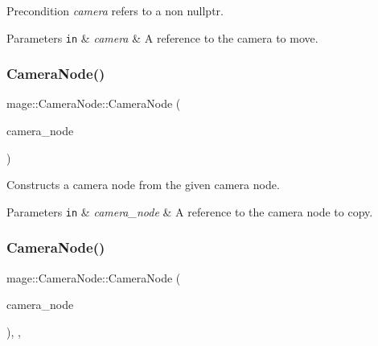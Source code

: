 \begin{DoxyPrecond}{Precondition}
{\itshape camera} refers to a non {\ttfamily nullptr}. 
\end{DoxyPrecond}

\begin{DoxyParams}[1]{Parameters}
\mbox{\tt in}  & {\em camera} & A reference to the camera to move. \\
\hline
\end{DoxyParams}
\hypertarget{classmage_1_1_camera_node_aa0becc29c416c313ebda763edb1b2181}{}\label{classmage_1_1_camera_node_aa0becc29c416c313ebda763edb1b2181} 
\subsubsection{\texorpdfstring{Camera\+Node()}{CameraNode()}\hspace{0.1cm}{\footnotesize\ttfamily [2/3]}}
{\footnotesize\ttfamily mage\+::\+Camera\+Node\+::\+Camera\+Node (\begin{DoxyParamCaption}\item[{const \hyperlink{classmage_1_1_camera_node}{Camera\+Node} \&}]{camera\+\_\+node }\end{DoxyParamCaption})\hspace{0.3cm}{\ttfamily [protected]}}

Constructs a camera node from the given camera node.


\begin{DoxyParams}[1]{Parameters}
\mbox{\tt in}  & {\em camera\+\_\+node} & A reference to the camera node to copy. \\
\hline
\end{DoxyParams}
\hypertarget{classmage_1_1_camera_node_a6ed405e70c5105f36938bdbc66c15fc4}{}\label{classmage_1_1_camera_node_a6ed405e70c5105f36938bdbc66c15fc4} 
\subsubsection{\texorpdfstring{Camera\+Node()}{CameraNode()}\hspace{0.1cm}{\footnotesize\ttfamily [3/3]}}
{\footnotesize\ttfamily mage\+::\+Camera\+Node\+::\+Camera\+Node (\begin{DoxyParamCaption}\item[{\hyperlink{classmage_1_1_camera_node}{Camera\+Node} \&\&}]{camera\+\_\+node }\end{DoxyParamCaption})\hspace{0.3cm}{\ttfamily [protected]}, {\ttfamily [default]}, {\ttfamily [noexcept]}}

